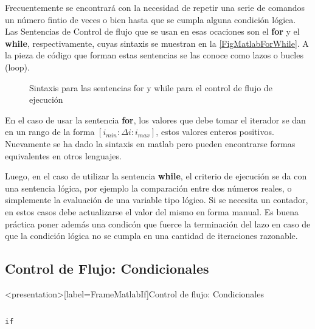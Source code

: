 
Frecuentemente se encontrará con la necesidad de repetir una serie de 
comandos un número fintio de veces o bien hasta que se cumpla alguna 
condición lógica. Las Sentencias de Control de flujo que se usan en esas 
ocaciones son el \textbf{for} y el \textbf{while}, respectivamente, 
cuyas sintaxis se muestran en la \autoref{FigMatlabForWhile}. A la pieza de
código que forman estas sentencias se las conoce como
lazos o bucles (loop).

\begin{figure}
  \caption{
    Sintaxis para las sentencias for y while
  para el control de flujo de ejecución \label{FigMatlabForWhile}
}
\end{figure}

En el caso de usar la sentencia \textbf{for}, los valores que debe tomar
el iterador se dan en un rango de la forma  $[ i_{min} :  \Delta i : i_{max} ]$, 
estos valores enteros positivos. Nuevamente se ha dado la sintaxis en matlab
pero pueden encontrarse formas equivalentes en otros lenguajes. 

Luego, en el caso de utilizar la sentencia \textbf{while}, el criterio 
de ejecución se da con una sentencia lógica, por ejemplo la comparación
entre dos números reales, o simplemente la evaluación de una 
variable tipo lógico. Si se necesita un contador, en estos casos
debe actualizarse el valor del mismo en forma manual. Es buena
práctica poner además una condicón que fuerce la terminación  
del lazo en caso de que la condición lógica no se cumpla 
en una cantidad de iteraciones razonable. 

\mode*

\subsection{Control de Flujo: Condicionales}

\begin{frame}<presentation>[label=FrameMatlabIf]{Control de flujo: Condicionales} 
\begin{columns}[T]
\hfill \large\texttt{if}

\begin{codeblock}

\end{codeblock}

\begin{codeblock}

\end{codeblock}

\end{columns}
\end{frame}

